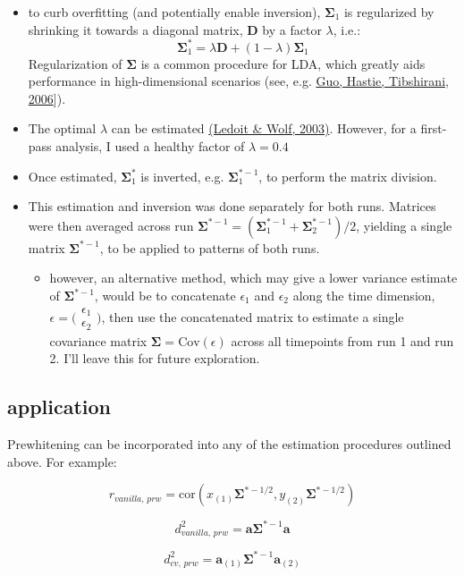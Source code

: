 \documentclass{article}\usepackage[]{graphicx}\usepackage[]{color}
\begin{document}
\begin{itemize}
  \item to curb overfitting (and potentially enable inversion), $\mathbf{\Sigma}_1$ is regularized by shrinking it towards a diagonal matrix, \textbf{D} by a factor $\lambda$, i.e.: 
    \[\mathbf{\Sigma}^*_1 = \lambda \mathbf{D} + (1 - \lambda) \mathbf{\Sigma}_1\]
    Regularization of $\mathbf{\Sigma}$ is a common procedure for LDA, which greatly aids performance in high-dimensional scenarios (see, e.g. \href{https://doi.org/10.1093/biostatistics/kxj035}{Guo, Hastie, Tibshirani, 2006}]).
  \item The optimal $\lambda$ can be estimated \href{https://repositori.upf.edu/bitstream/handle/10230/560/691.pdf}{(Ledoit \& Wolf, 2003)}.
    However, for a first-pass analysis, I used a healthy factor of $\lambda = 0.4$
  \item Once estimated, $\mathbf{\Sigma}^*_1$ is inverted, e.g. $\mathbf{\Sigma}^{*-1}_1$, to perform the matrix division.
  \item This estimation and inversion was done separately for both runs. Matrices were then averaged across run
    $\mathbf{\Sigma}^{*-1} = (\mathbf{\Sigma}^{*-1}_1 + \mathbf{\Sigma}^{*-1}_2)/2$, yielding a single matrix $\mathbf{\Sigma}^{*-1}$, to be applied to patterns of both runs.
    \begin{itemize}
      \item however, an alternative method, which may give a lower variance estimate of $\mathbf{\Sigma}^{*-1}$, would be to concatenate $\epsilon_1$ and $\epsilon_2$ along the time dimension,
        $\epsilon = \big(\begin{smallmatrix}
        \epsilon_1\\
        \epsilon_2
        \end{smallmatrix}\big)$,
        then use the concatenated matrix to estimate a single covariance matrix $\mathbf{\Sigma} = \text{Cov}(\epsilon)$ across all timepoints from run 1 and run 2.
        I'll leave this for future exploration.
    \end{itemize}
\end{itemize}


\subsection*{application}

Prewhitening can be incorporated into any of the estimation procedures outlined above.
For example:

\[r_\textit{vanilla, prw} = \text{cor}(x_{(1)}\mathbf{\Sigma}^{*-1/2}, y_{(2)}\mathbf{\Sigma}^{*-1/2})\]

\[d^2_\textit{vanilla, prw} = \mathbf{a} \mathbf{\Sigma}^{*-1} \mathbf{a}\]

\[d^2_\textit{cv, prw} = \mathbf{a}_{(1)} \mathbf{\Sigma}^{*-1} \mathbf{a}_{(2)}\]
\end{document}
